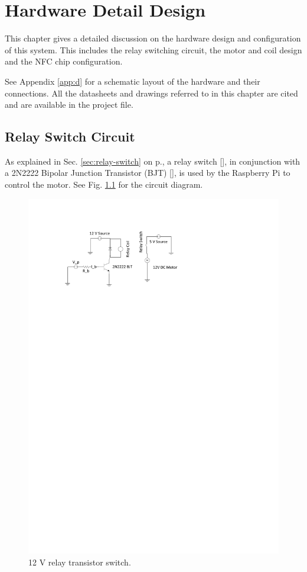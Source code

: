 \chapter{Hardware Detail Design}
\label{chap:5}

This chapter gives a detailed discussion on the hardware design and
configuration of this system. This includes the relay switching circuit, the
motor and coil design and the NFC chip configuration.

See Appendix \ref{app:d} for a schematic layout of the hardware and their
connections. All the datasheets and drawings referred to in this chapter are
cited and are available in the project file. 

\section{Relay Switch Circuit}
\label{sec:detail-switch}

As explained in Sec. \ref{sec:relay-switch} on p.\pageref{sec:relay-switch}, a relay
switch [\cite{manual:relay-specs}], in conjunction with a 2N2222
Bipolar Junction Transistor (BJT) [\cite{maunual:transistor-datasheet}], is used
by the Raspberry Pi to control the motor. See Fig.
\ref{fig:relay-switch} for the circuit diagram.

\begin{figure}
\centering
\includegraphics[clip = true, trim = 70 640 0 70, scale=1.2]{relay_switch}
\caption{12 V relay transistor switch.}
\label{fig:relay-switch}
\end{figure}

